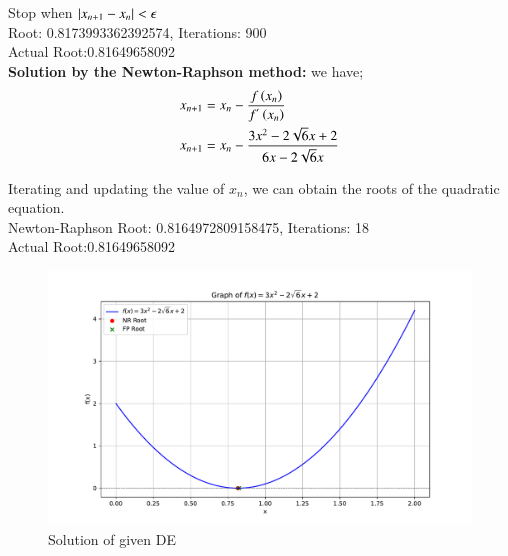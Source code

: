 \documentclass[journal,12pt,onecolumn]{IEEEtran}
\theoremstyle{remark}
\begin{document}
Stop when $\left\vert x_{n+1}-x_n\right\vert<\epsilon$\\
Root: 0.8173993362392574, Iterations: 900\\
Actual Root:0.81649658092\\


\textbf{Solution by the Newton-Raphson method:}
we have;
\begin{align}
	x_{n+1}&=x_n -\frac{f\left(x_n\right)}{f^{'}\left(x_n\right)}\\
	x_{n+1}&=x_n - \frac{3x^2 - 2\sqrt{6}x + 2}{6x - 2\sqrt{6}x}
\end{align}

Iterating and updating the value of $x_{n}$, we can obtain the roots of the quadratic equation. \\
Newton-Raphson Root: 0.8164972809158475, Iterations: 18\\
Actual Root:0.81649658092\\

\begin{figure}[h]
	\centering
	\includegraphics[width=\columnwidth]{figs/fig.pdf}
	\caption{Solution of given DE}
	\label{fig}
\end{figure}
\end{document}
